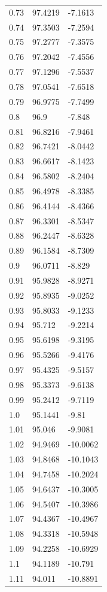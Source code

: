 \begin{table}
\begin{tabular}{lll}
0.73 & 97.4219 & -7.1613 \\
0.74 & 97.3503 & -7.2594 \\
0.75 & 97.2777 & -7.3575 \\
0.76 & 97.2042 & -7.4556 \\
0.77 & 97.1296 & -7.5537 \\
0.78 & 97.0541 & -7.6518 \\
0.79 & 96.9775 & -7.7499 \\
0.8 & 96.9 & -7.848 \\
0.81 & 96.8216 & -7.9461 \\
0.82 & 96.7421 & -8.0442 \\
0.83 & 96.6617 & -8.1423 \\
0.84 & 96.5802 & -8.2404 \\
0.85 & 96.4978 & -8.3385 \\
0.86 & 96.4144 & -8.4366 \\
0.87 & 96.3301 & -8.5347 \\
0.88 & 96.2447 & -8.6328 \\
0.89 & 96.1584 & -8.7309 \\
0.9 & 96.0711 & -8.829 \\
0.91 & 95.9828 & -8.9271 \\
0.92 & 95.8935 & -9.0252 \\
0.93 & 95.8033 & -9.1233 \\
0.94 & 95.712 & -9.2214 \\
0.95 & 95.6198 & -9.3195 \\
0.96 & 95.5266 & -9.4176 \\
0.97 & 95.4325 & -9.5157 \\
0.98 & 95.3373 & -9.6138 \\
0.99 & 95.2412 & -9.7119 \\
1.0 & 95.1441 & -9.81 \\
1.01 & 95.046 & -9.9081 \\
1.02 & 94.9469 & -10.0062 \\
1.03 & 94.8468 & -10.1043 \\
1.04 & 94.7458 & -10.2024 \\
1.05 & 94.6437 & -10.3005 \\
1.06 & 94.5407 & -10.3986 \\
1.07 & 94.4367 & -10.4967 \\
1.08 & 94.3318 & -10.5948 \\
1.09 & 94.2258 & -10.6929 \\
1.1 & 94.1189 & -10.791 \\
1.11 & 94.011 & -10.8891 \\

\end{tabular}
\end{table}
